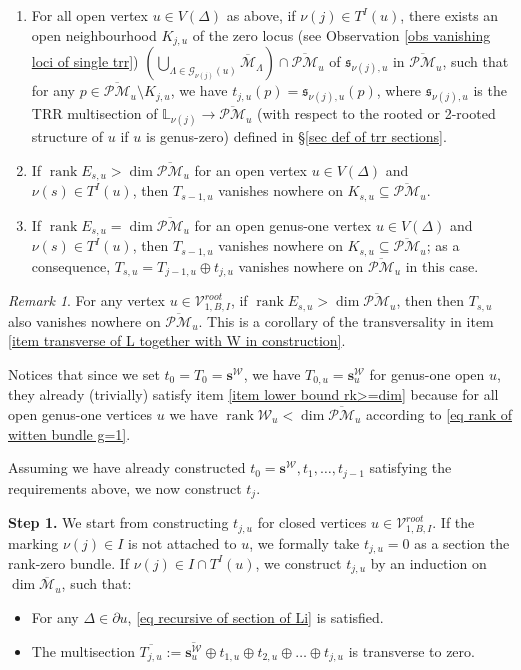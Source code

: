 \documentclass[11pt]{amsart}
\theoremstyle{definition}
\theoremstyle{remark}
\newtheorem{rmk}[dummy]{Remark}
\newcommand{\oPMb}{{\overline{\mathcal{PM}}}}
\newcommand{\<}{\left<}
\renewcommand{\>}{\right>}
\numberwithin{equation}{section}
\DeclareMathOperator{\rk}{rank}
\def\Mbar{{\overline{\mathcal M}}}
\begin{document}
\begin{enumerate}
    \item \label{item construction tame K}
    For all open vertex $u\in V(\Delta)$ as above, if $\nu(j)\in T^I(u)$, there exists an open neighbourhood $K_{j,u}$  of the zero locus (see Observation \ref{obs vanishing loci of single trr}) $\left( \bigcup_{\Lambda\in \mathcal G_{\nu(j)}(u)}\Mbar_\Lambda\right)\cap \oPMb_u$ of $\mathfrak s_{\nu(j),u}$ in $\oPMb_u$, such that for any $p\in\oPMb_u\setminus K_{j,u}$, we have $t_{j,u}(p)=\mathfrak s_{\nu(j),u}(p)$, where $\mathfrak s_{\nu(j),u}$ is the TRR multisection of $\mathbb L_{\nu(j)}\to \oPMb_u$ (with respect to the rooted or 2-rooted structure of $u$ if $u$ is genus-zero) defined in \S \ref{sec def of trr sections}.

    \item \label{item lower bound rk>dim}
    If $\rk  E_{s,u}> \dim \oPMb_u$ for an open  vertex $u\in V(\Delta)$ and $\nu(s)\in T^I(u)$, then $T_{s-1,u}$ vanishes nowhere on $K_{s,u}\subseteq\oPMb_u$.

     \item \label{item lower bound rk>=dim}
    If $\rk  E_{s,u}= \dim \oPMb_u$ for an open genus-one vertex $u\in V(\Delta)$ and $\nu(s)\in T^I(u)$, then $T_{s-1,u}$ vanishes nowhere on $K_{s,u}\subseteq\oPMb_u$; as a consequence, $T_{s,u}=T_{j-1,u}\oplus t_{j,u}$ vanishes nowhere on $\oPMb_u$ in this case.
 \end{enumerate}
 \begin{rmk}\label{rmk on non vanishment of section}
     For any vertex $u\in \mathcal V^{root}_{1,B,I}$, if $\rk  E_{s,u}> \dim \oPMb_u$, then then $T_{s,u}$ also vanishes nowhere on $\oPMb_u$.
     This is a corollary of the transversality in item \ref{item transverse of L together with W in construction}. 


Notices that since we set $t_0=T_0= \bm{s}^{\mathcal W}$, we have $T_{0,u}=\bm{s}^{\mathcal W}_u$ for genus-one open $u$, they already (trivially) satisfy 
item \ref{item lower bound rk>=dim} because for all open genus-one vertices $u$ we have $\rk \mathcal W_u< \dim \oPMb_u$ according to \eqref{eq rank of witten bundle g=1}.
 \end{rmk}

Assuming we have already constructed $t_0=\bm{s}^{\mathcal W}, t_1, \dots, t_{j-1}$ satisfying the requirements above, we now construct $t_j$. 

\noindent\textbf{Step 1.} We start from constructing $t_{j,u}$ for closed vertices $u\in \mathcal V^{root}_{1,B,I}$. If the marking $\nu(j)\in I$ is not attached to $u$, we formally take $t_{j,u}=0$ as a section the rank-zero bundle. If  $\nu(j)\in I\cap T^I(u)$, we construct $t_{j,u}$ by an induction on $\dim \Mbar_u$, such that:
\begin{itemize}
    \item For any $\Delta \in \partial u$, \eqref{eq recursive of section of Li} is satisfied.
    \item The multisection $\overline{T_{j,u}}:=\overline{\bm{s}^{\mathcal W}_u} \oplus t_{1,u}\oplus t_{2,u}\oplus\dots \oplus t_{j,u}$ is transverse to zero.
    \end{itemize}
\end{document}
